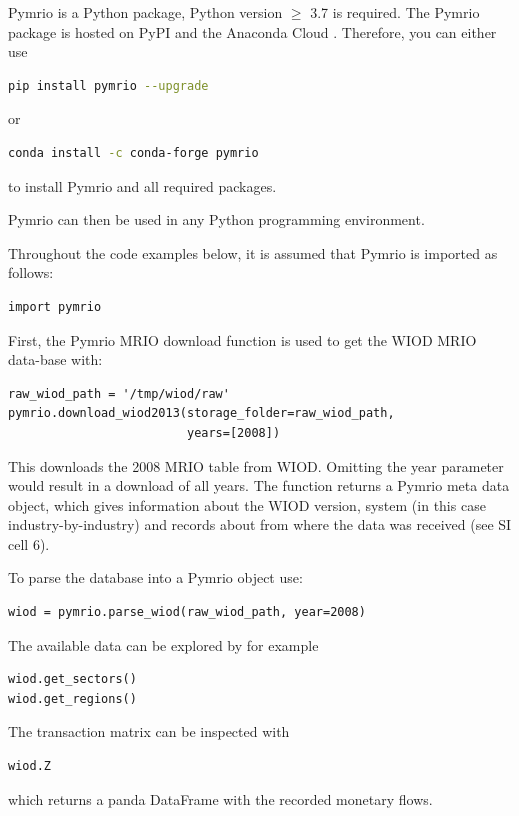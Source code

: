 \documentclass{jors}
\begin{document}
Pymrio is a Python \cite{python2018_Official} package, Python version  $\geq$ 3.7 is required.
The Pymrio package is hosted on PyPI  \cite{pypi2018_PyPI}  and the Anaconda Cloud \cite{anacondainc.2018_Anaconda}.
Therefore, you can either use
\begin{lstlisting}[language=Bash]
pip install pymrio --upgrade
\end{lstlisting}
or
\begin{lstlisting}[language=Bash]
conda install -c conda-forge pymrio 
\end{lstlisting}

to install Pymrio and all required packages.

Pymrio can then be used in any Python programming environment.

Throughout the code examples below, it is assumed that Pymrio is imported as follows: 

\begin{lstlisting}
import pymrio
\end{lstlisting}

First, the Pymrio MRIO download function is used to get the WIOD MRIO data-base with:
\begin{lstlisting}
raw_wiod_path = '/tmp/wiod/raw'
pymrio.download_wiod2013(storage_folder=raw_wiod_path,
                         years=[2008])
\end{lstlisting}

This downloads the 2008 MRIO table from WIOD. Omitting the year parameter would result in a download of all years.
The function returns a Pymrio meta data object, which gives information about the WIOD version, system (in this case industry-by-industry) and records about from where the data was received (see SI cell 6).

To parse the database into a Pymrio object use:
\begin{lstlisting}
wiod = pymrio.parse_wiod(raw_wiod_path, year=2008)
\end{lstlisting}

The available data can be explored by for example
\begin{lstlisting}
wiod.get_sectors()
wiod.get_regions()
\end{lstlisting}

The transaction matrix can be inspected with
\begin{lstlisting}
wiod.Z
\end{lstlisting}

which returns a panda DataFrame with the recorded monetary flows.
\end{document}
